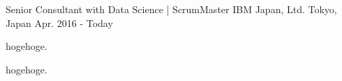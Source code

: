 

\begin{cventries}

  \cventry
    {Senior Consultant with Data Science | ScrumMaster} %
    {IBM Japan, Ltd.} %
    {Tokyo, Japan} %
    {Apr. 2016 - Today} %
    {
      \begin{cvitems} %
        \item {hogehoge.}
        \item {hogehoge.}
      \end{cvitems}
    }
\end{cventries}
